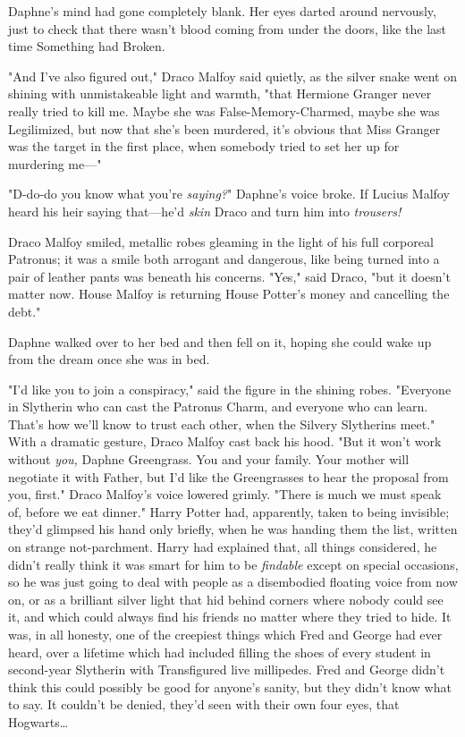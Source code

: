 Daphne's mind had gone completely blank. Her eyes darted around nervously, just 
to check that there wasn't blood coming from under the doors, like the last 
time Something had Broken.

"And I've also figured out," Draco Malfoy said quietly, as the silver snake 
went on shining with unmistakeable light and warmth, "that Hermione Granger 
never really tried to kill me. Maybe she was False-Memory-Charmed, maybe she 
was Legilimized, but now that she's been murdered, it's obvious that Miss 
Granger was the target in the first place, when somebody tried to set her up 
for murdering me---"

"D-do-do you know what you're \emph{saying?}" Daphne's voice broke. If Lucius 
Malfoy heard his heir saying that---he'd \emph{skin} Draco and turn him into 
\emph{trousers!}

Draco Malfoy smiled, metallic robes gleaming in the light of his full corporeal 
Patronus; it was a smile both arrogant and dangerous, like being turned into a 
pair of leather pants was beneath his concerns. "Yes," said Draco, "but it 
doesn't matter now. House Malfoy is returning House Potter's money and 
cancelling the debt."

Daphne walked over to her bed and then fell on it, hoping she could wake up 
from the dream once she was in bed.

"I'd like you to join a conspiracy," said the figure in the shining robes. 
"Everyone in Slytherin who can cast the Patronus Charm, and everyone who can 
learn. That's how we'll know to trust each other, when the Silvery Slytherins 
meet." With a dramatic gesture, Draco Malfoy cast back his hood. "But it won't 
work without \emph{you,} Daphne Greengrass. You and your family. Your mother 
will negotiate it with Father, but I'd like the Greengrasses to hear the 
proposal from you, first." Draco Malfoy's voice lowered grimly. "There is much 
we must speak of, before we eat dinner."
\sbreak
Harry Potter had, apparently, taken to being invisible; they'd glimpsed his 
hand only briefly, when he was handing them the list, written on strange 
not-parchment. Harry had explained that, all things considered, he didn't 
really think it was smart for him to be \emph{findable} except on special 
occasions, so he was just going to deal with people as a disembodied floating 
voice from now on, or as a brilliant silver light that hid behind corners where 
nobody could see it, and which could always find his friends no matter where 
they tried to hide. It was, in all honesty, one of the creepiest things which 
Fred and George had ever heard, over a lifetime which had included filling the 
shoes of every student in second-year Slytherin with Transfigured live 
millipedes. Fred and George didn't think this could possibly be good for 
anyone's sanity, but they didn't know what to say. It couldn't be denied, 
they'd seen with their own four eyes, that Hogwarts{\ldots}

